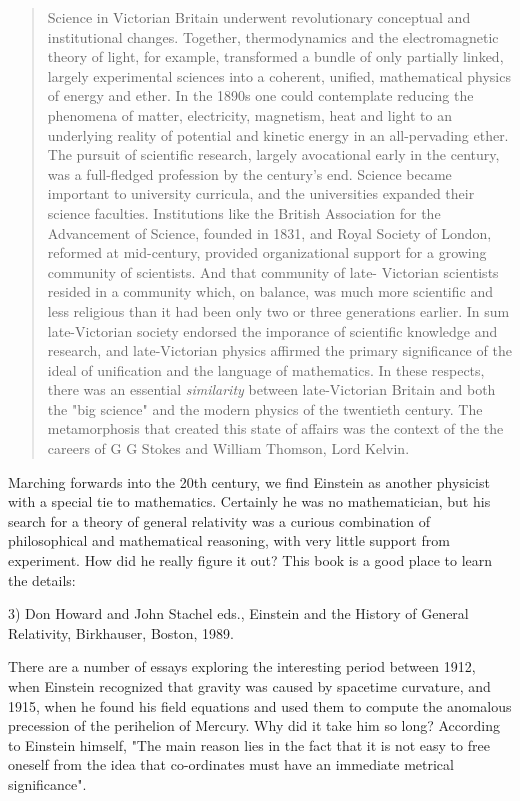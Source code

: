\begin{quote}
     Science in Victorian Britain underwent revolutionary conceptual
     and institutional changes.  Together, thermodynamics and the 
     electromagnetic theory of light, for example, transformed a bundle
     of only partially linked, largely experimental sciences into a 
     coherent, unified, mathematical physics of energy and ether.  In
     the 1890s one could contemplate reducing the phenomena of matter,
     electricity, magnetism, heat and light to an underlying reality of
     potential and kinetic energy in an all-pervading ether.  The pursuit
     of scientific research, largely avocational early in the century, 
     was a full-fledged profession by the century's end.  Science became
     important to university curricula, and the universities expanded
     their science faculties.  Institutions like the British Association
     for the Advancement of Science, founded in 1831, and Royal Society
     of London, reformed at mid-century, provided organizational support
     for a growing community of scientists.  And that community of late-
     Victorian scientists resided in a community which, on balance, was
     much more scientific and less religious than it had been only two
     or three generations earlier.  In sum late-Victorian society 
     endorsed the imporance of scientific knowledge and research, and
     late-Victorian physics affirmed the primary significance of the 
     ideal of unification and the language of mathematics.  In these
     respects, there was an essential \emph{similarity} between late-Victorian
     Britain and both the "big science" and the modern physics of the
     twentieth century.  The metamorphosis that created this state of
     affairs was the context of the the careers of G G Stokes and William
     Thomson, Lord Kelvin.
\end{quote}
Marching forwards into the 20th century, we find Einstein as another
physicist with a special tie to mathematics.  Certainly he was no
mathematician, but his search for a theory of general relativity was
a curious combination of philosophical and mathematical reasoning, 
with very little support from experiment.  How did he really figure
it out?  This book is a good place to learn the details:

3) Don Howard and John Stachel eds., Einstein and the History of General
Relativity, Birkhauser, Boston, 1989.  

There are a number of essays exploring the interesting period between
1912, when Einstein recognized that gravity was caused by spacetime
curvature, and 1915, when he found his field equations and used them to
compute the anomalous precession of the perihelion of Mercury.  Why did
it take him so long?  According to Einstein himself, "The main reason
lies in the fact that it is not easy to free oneself from the idea that
co-ordinates must have an immediate metrical significance". 

